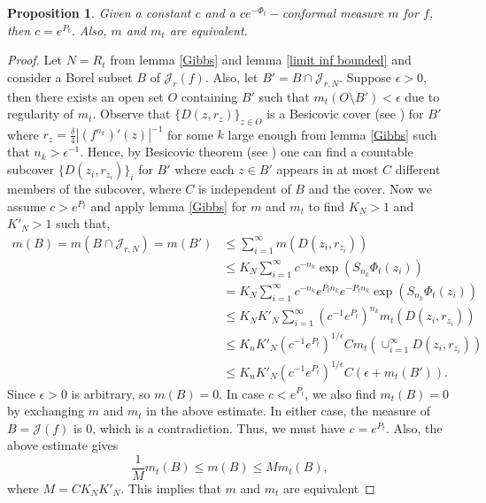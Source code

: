 \documentclass[12pt,reqno]{amsart}
\newtheorem{proposition}[theorem]{Proposition}
\begin{document}
\begin{proposition}\label{unique}
    Given a constant $c$ and a $ce^{-\Phi_t}-$conformal measure $m$ for $f$, then $c=e^{P_t}$. Also, $m$ and $m_t$ are equivalent.
\end{proposition}
\begin{proof}
    Let $N=R_t$ from lemma \ref{Gibbs} and lemma \ref{limit inf bounded} and consider a Borel subset $B$ of $\mathcal{J}_r(f)$. Also, let $B'=B\cap \mathcal{J}_{r,N}$. Suppose $\epsilon>0$, then there exists an open set $O$ containing $B'$ such that $m_t(O \setminus B')<\epsilon$ due to regularity of $m_t$. Observe that $\{ D(z,r_z) \}_{z \in O}$ is a Besicovic cover (see \citep[p. 103]{DiBenedetto}) for $B'$ where $r_z=\frac{\delta}{4} |(f^{n_k})'(z)|^{-1}$ for some $k$ large enough from lemma \ref{Gibbs} such that $n_k>\epsilon^{-1}$. Hence, by Besicovic theorem (see \citep[p. 103]{DiBenedetto}) one can find a countable subcover $\{ D(z_i,r_{z_i}) \}_i$ for $B'$ where each $z\in B'$ appears in at most $C$ different members of the subcover, where $C$ is independent of $B$ and the cover. Now we assume $c>e^{P_t}$ and  apply lemma \ref{Gibbs} for $m$ and $m_t$ to find $K_N>1$ and $K'_N>1$ such that,
    \begin{align*}
        m(B)=m(B\cap \mathcal{J}_{r,N})=m(B') & \leq \sum_{i=1}^{\infty}m \left(D(z_i,r_{z_i}) \right)\\
        &\leq K_N \sum_{i=1}^{\infty} c^{-n_k}\exp (S_{n_k}\Phi_t(z_i))\\
        &=K_N\sum_{i=1}^{\infty} c^{-n_k}e^{P_tn_k}e^{-P_tn_k}\exp (S_{n_k}\Phi_t(z_i))\\
        & \leq K_NK'_N\sum_{i=1}^{\infty}(c^{-1}e^{P_t})^{n_k}m_t \left( D(z_i,r_{z_i}) \right)\\
        & \leq K_nK'_N (c^{-1}e^{P_t})^{1/\epsilon}Cm_t\left(\cup_{i=1}^{\infty}D(z_i,r_{z_i}) \right)\\
        & \leq K_nK'_N (c^{-1}e^{P_t})^{1/\epsilon}C \left( \epsilon+m_t(B') \right).
    \end{align*}
    Since $\epsilon>0$ is arbitrary, so $m(B)=0$. In case $c<e^{P_t}$, we also find $m_t(B)=0$ by exchanging $m$ and $m_t$ in the above estimate. In either case, the measure of $B=\mathcal{J}(f)$ is $0$, which is a contradiction. Thus, we must have $c=e^{P_t}$. Also, the above estimate gives
    $$\frac{1}{M}m_t(B) \leq m(B) \leq M m_t(B),$$
    where $M=CK_NK'_N$.
    This implies that $m$ and $m_t$ are equivalent 
\end{proof}
\end{document}
